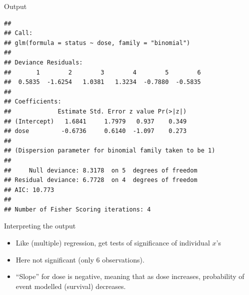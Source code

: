\begin{frame}[fragile]{Output}

  {\footnotesize
 
\begin{knitrout}
\color{fgcolor}\begin{kframe}
\begin{alltt}
\end{alltt}
\begin{verbatim}
## 
## Call:
## glm(formula = status ~ dose, family = "binomial")
## 
## Deviance Residuals: 
##       1        2        3        4        5        6  
##  0.5835  -1.6254   1.0381   1.3234  -0.7880  -0.5835  
## 
## Coefficients:
##             Estimate Std. Error z value Pr(>|z|)
## (Intercept)   1.6841     1.7979   0.937    0.349
## dose         -0.6736     0.6140  -1.097    0.273
## 
## (Dispersion parameter for binomial family taken to be 1)
## 
##     Null deviance: 8.3178  on 5  degrees of freedom
## Residual deviance: 6.7728  on 4  degrees of freedom
## AIC: 10.773
## 
## Number of Fisher Scoring iterations: 4
\end{verbatim}
\end{kframe}
\end{knitrout}
}   

\end{frame}


\begin{frame}{Interpreting the output}
  \begin{itemize}
  \item Like (multiple) regression, get
   tests of significance of individual $x$'s
  \item     Here not significant (only 6 observations).
  \item ``Slope'' for dose is negative, meaning that as dose increases, probability of event modelled (survival) decreases.

\end{itemize}

\end{frame}

